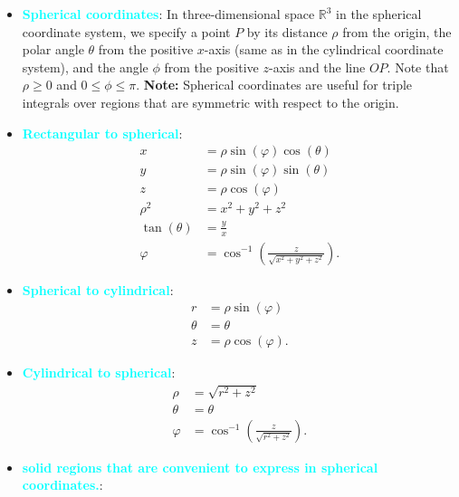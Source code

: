 \documentclass{report}
\begin{document}
\begin{itemize}
        \item \textbf{\textcolor{cyan}{Spherical coordinates}}:
            In three-dimensional space \(\mathbb{R}^3\) in the spherical coordinate system, we specify a point \(P\) by its distance \(\rho\) from the origin, the polar angle \(\theta\) from the positive \(x\)-axis (same as in the cylindrical coordinate system), and the angle \(\phi\) from the positive \(z\)-axis and the line \(OP\). Note that \(\rho \geq 0\) and \(0 \leq \phi \leq \pi\).
            \bigbreak \noindent 
            \bigbreak \noindent 
            \textbf{Note:} Spherical coordinates are useful for triple integrals over regions that are symmetric with respect to the origin.
    \item \textbf{\textcolor{cyan}{Rectangular to spherical}}:
        \begin{align*}
            x &= \rho\sin{\left(\varphi\right)}\cos{\left(\theta \right)} \\
            y &= \rho\sin{\left(\varphi\right)}\sin{\left(\theta \right)} \\
            z &= \rho\cos{\left(\varphi\right)} \\
            \rho^{2} &= x^{2} + y^{2} + z^{2} \\
            \tan{\left(\theta \right)} &= \frac{y}{x} \\
            \varphi &= \cos^{-1}{\left(\frac{z}{\sqrt{x^{2} + y^{2} + z^{2}}}\right)}
        .\end{align*}
    \item \textbf{\textcolor{cyan}{Spherical to cylindrical}}:
        \begin{align*}
            r &= \rho\sin{\left(\varphi\right)} \\
            \theta  &= \theta  \\
            z &= \rho\cos{\left(\varphi\right)} 
        .\end{align*}
    \item \textbf{\textcolor{cyan}{Cylindrical to spherical}}:
        \begin{align*}
            \rho &= \sqrt{r^{2} + z^{2}} \\
            \theta  &= \theta  \\
            \varphi &= \cos^{-1}{\left(\frac{z}{\sqrt{r^{2} + z^{2}}}\right)}
        .\end{align*}
    \item \textbf{\textcolor{cyan}{solid regions that are convenient to express in spherical coordinates.}}:

\end{itemize}
\end{document}

